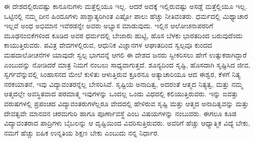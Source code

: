 ಈ ದೇಶದಲ್ಲಿರುವಷ್ಟು ಕಾನೂನುಗಳು ಮತ್ತೆಲ್ಲಿಯೂ ಇಲ್ಲ. ಆದರೆ ಅದಕ್ಕೆ ಇಲ್ಲಿರುವಷ್ಟು ಅಸಡ್ಡೆ ಮತ್ತೆಲ್ಲಿಯೂ ಇಲ್ಲ. ಒಟ್ಟಿನಲ್ಲಿ ನಮ್ಮ ದೀನ ಹಿಂದೂಗಳು ಪಾಶ್ಚಾತ್ಯರಿಗಿಂತ ಎಷ್ಟೋ ಪಾಲು ಹೆಚ್ಚು ನೀತಿವಂತರು. ಧರ್ಮದಲ್ಲಿ ಮಿಥ್ಯಾಚಾರ ಇಲ್ಲವೆ ಅಂಧ ಅಭಿಮಾನ ಇವೆರಡನ್ನೇ ಅವರು ಅಭ್ಯಾಸ ಮಾಡುವುದು. ಇಲ್ಲಿನ ಆಲೋಚನಾಪರರಿಗೆ ಮೂಢನಂಬಿಕೆಗಳಿಂದ ಕೂಡಿದ ಅವರ ಧರ್ಮದಲ್ಲಿ ಬೇಜಾರು ಹುಟ್ಟಿ, ಹೊಸ ಬೆಳಕು ಭಾರತದಿಂದ ಬರುವುದೆಂದು ಕಾಯುತ್ತಿರುವರು. ಪವಿತ್ರ ವೇದಗಳಲ್ಲಿರುವ, ಆಧುನಿಕ ವಿಜ್ಞಾನಗಳ ಆಘಾತದಿಂದ ಸ್ವಲ್ಪವೂ ಕುಂದದ ಮಹದಾಲೋಚನೆಗಳ ಯಾವುದೇ ಸ್ವಲ್ಪ ಭಾಗವನ್ನೆ ಆಗಲಿ ಈ ದೇಶದ ಜನರು ಸ್ವೀಕರಿಸಲು ಹೇಗೆ ಉತ್ಸುಕರಾಗಿದ್ದಾರೆ ಎಂಬುದನ್ನು ನೋಡಿದರೆ ಮಾತ್ರ ನಿಮಗೆ ನಂಬಲು ಸಾಧ್ಯವಾಗುತ್ತದೆ. ಶೂನ್ಯದಿಂದ ಸೃಷ್ಟಿ, ಹೊಸದಾಗಿ ಸೃಷ್ಟಿಸಿದ ಜೀವ, ಸ್ವರ್ಗವೆನ್ನುವಲ್ಲಿ ಸಿಂಹಾಸನದ ಮೇಲೆ ಕುಳಿತು ಆಳುತ್ತಿರುವ ಕ್ರೂರನೂ ಅತ್ಯಾಚಾರಿಯೂ ಆದ ಈಶ್ವರ, ಕೆಳಗೆ ನಿತ್ಯ ನರಕಯಾತನೆ, ಇವು ವಿದ್ಯಾವಂತರನ್ನೆಲ್ಲ ಬೇಸರಿಸಿವೆ. ಸೃಷ್ಟಿಯ ಅನಾದಿತ್ವ, ಅದರಂತೆ ಆತ್ಮದ ನಿತ್ಯತ್ವ, ಮತ್ತು ನಮ್ಮ ಆತ್ಮದಲ್ಲೇ ಅವಸ್ಥಿತವಾದ ಪರಮಾತ್ಮ \enginline{-} ಇವುಗಳನ್ನು ಒಂದಲ್ಲ ಒಂದು ವಿಧದಲ್ಲಿ ಕಲಿಯುತ್ತಿರುವರು. ಇನ್ನು ಐವತ್ತು ವರುಷಗಳಲ್ಲಿ ಪ್ರಪಂಚದ ವಿದ್ಯಾವಂತರುಗಳೆಲ್ಲರೂ ವೇದದಲ್ಲಿ ಹೇಳಿರುವ ಸೃಷ್ಟಿ ಮತ್ತು ಆತ್ಮದ ಅನಾದಿತ್ವವನ್ನು ಮತ್ತು ದೇವತ್ವವೇ ಮಾನವನ ಚರಮಗುರಿ ಹಾಗೂ ಪೂರ್ಣಾವಸ್ಥೆ ಎಂಬ ವಿಷಯಗಳನ್ನು ನಂಬುವರು. ಈಗಲೂ ಕೂಡ ವಿದ್ಯಾವಂತರಾದ ಪಾದ್ರಿಗಳು ಬೈಬಲನ್ನು ಆ ದೃಷ್ಟಿಯಿಂದ ವಿವರಿಸುತ್ತಿರುವರು. ಅವರಿಗೆ ಹೆಚ್ಚು ಆಧ್ಯಾತ್ಮಿಕ ವಿದ್ಯೆ ಬೇಕು, ನಮಗೆ ಹೆಚ್ಚು ಐಹಿಕ ಉನ್ನತಿಯ ಶಿಕ್ಷಣ ಬೇಕು ಎಂಬುದು ನನ್ನ ನಿರ್ಧಾರ.


